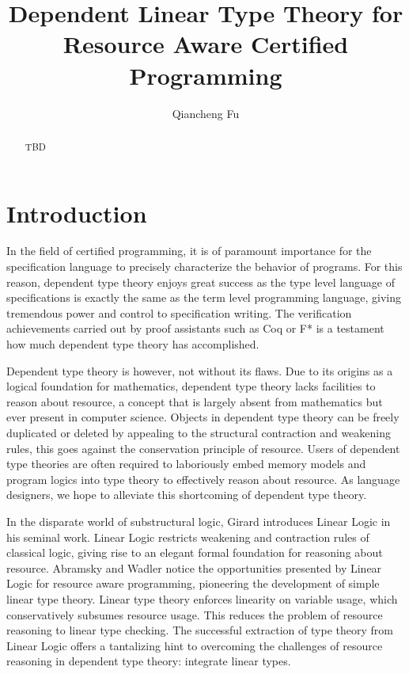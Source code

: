 \documentclass{article}
\title{Dependent Linear Type Theory for Resource Aware Certified Programming}
\author{Qiancheng Fu}
\begin{document}
  \maketitle 
  \begin{abstract}
    TBD
  \end{abstract}

  \section{Introduction}
  In the field of certified programming, it is of paramount importance for the specification language to precisely characterize the behavior of programs. For this reason, dependent type theory enjoys great success as the type level language of specifications is exactly the same as the term level programming language, giving tremendous power and control to specification writing. The verification achievements carried out by proof assistants such as Coq or F* is a testament how much dependent type theory has accomplished. 
  
  Dependent type theory is however, not without its flaws. Due to its origins as a logical foundation for mathematics, dependent type theory lacks facilities to reason about resource, a concept that is largely absent from mathematics but ever present in computer science. Objects in dependent type theory can be freely duplicated or deleted by appealing to the structural contraction and weakening rules, this goes against the conservation principle of resource. Users of dependent type theories are often required to laboriously embed memory models and program logics into type theory to effectively reason about resource. As language designers, we hope to alleviate this shortcoming of dependent type theory.

  In the disparate world of substructural logic, Girard introduces Linear Logic in his seminal work. Linear Logic restricts weakening and contraction rules of classical logic, giving rise to an elegant formal foundation for reasoning about resource. Abramsky and Wadler notice the opportunities presented by Linear Logic for resource aware programming, pioneering the development of simple linear type theory. Linear type theory enforces linearity on variable usage, which conservatively subsumes resource usage. This reduces the problem of resource reasoning to linear type checking. The successful extraction of type theory from Linear Logic offers a tantalizing hint to overcoming the challenges of resource reasoning in dependent type theory: integrate linear types.
\end{document}
